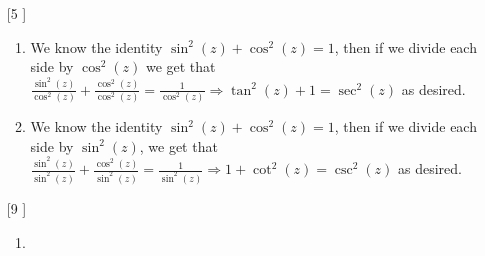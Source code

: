 \documentclass{article}
\theoremstyle{definition}
\begin{document}
\begin{enumerate}
\begin{enumerate}
    \end{enumerate}
    
    \item [[\phantom{-}5]]
    
    \begin{enumerate}
        \item 
        
        We know the identity $\sin^2(z) + \cos^2(z) = 1$, then if we divide each side by $\cos^2(z)$ we get that $\frac{\sin^2(z)}{\cos^2(z)} + \frac{\cos^2(z)}{\cos^2(z)} = \frac{1}{\cos^2(z)} \Rightarrow \tan^2(z) + 1 = \sec^2(z)$ as desired.
        
        \item
        
        We know the identity $\sin^2(z) + \cos^2(z) = 1$, then if we divide each side by $\sin^2(z)$, we get that $\frac{\sin^2(z)}{\sin^2(z)} + \frac{\cos^2(z)}{\sin^2(z)} = \frac{1}{\sin^2(z)} \Rightarrow 1 + \cot^2(z) = \csc^2(z)$ as desired. 
        
    \end{enumerate}
    
    \item [[\phantom{-}9]]
    
    \begin{enumerate}
        \item 
        

\end{enumerate}
\end{enumerate}
\end{document}
